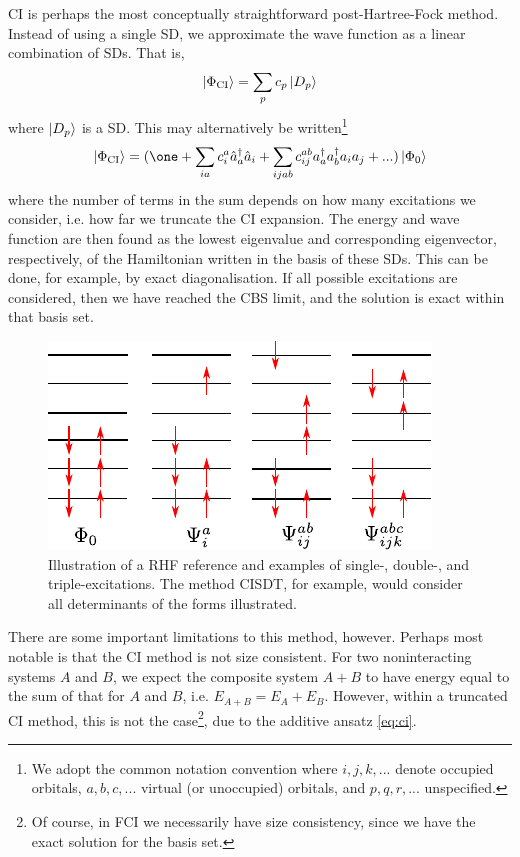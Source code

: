 \Gls{CI} is perhaps the most conceptually straightforward post-Hartree-Fock method. Instead of using a single \gls{SD}, we approximate the wave function as a linear combination of \glspl{SD}. That is,
\begin{equation}
\ket{\Phi_\mathrm{CI}} = \sum_p c_p\ket{D_p}
\end{equation}
where $\ket{D_p}$ is a \gls{SD}. This may alternatively be written\footnote{We adopt the common notation convention where $i,j,k,...$ denote occupied orbitals, $a,b,c,...$ virtual (or unoccupied) orbitals, and $p,q,r, ...$ unspecified.}
\begin{equation}
\label{eq:ci}
\ket{\Phi_\mathrm{CI}} = (\one + \sum_{ia}c_i^a\hat a_a^\dag\hat a_i +
\sum_{ijab}c_{ij}^{ab} a_a^\dag a_b^\dag a_i a_j+...)\ket{\Phi_0}
\end{equation}
where the number of terms in the sum depends on how many excitations we consider, i.e. how far we truncate the \gls{CI} expansion. The energy and wave function are then found as the lowest eigenvalue and corresponding eigenvector, respectively, of the Hamiltonian written in the basis of these \glspl{SD}. This can be done, for example, by exact diagonalisation. If all possible excitations are considered, then we have reached the \gls{CBS} limit, and the solution is exact within that basis set.

\begin{figure}[htbp]
    \centering
    \includegraphics{figures/intro/configurations.pdf}
    \caption{Illustration of a \gls{RHF} reference and examples of single-, double-, and triple-excitations. The method CISDT, for example, would consider all determinants of the forms illustrated.}
    \label{fig:excitations}
\end{figure}

There are some important limitations to this method, however. Perhaps most notable is that the \gls{CI} method is not size consistent. For two noninteracting systems $A$ and $B$, we expect the composite system $A+B$ to have energy equal to the sum of that for $A$ and $B$, i.e. $E_{A+B}=E_A+E_B$. However, within a truncated \gls{CI} method, this is not the case\footnote{Of course, in \gls{FCI} we necessarily have size consistency, since we have the exact solution for the basis set.}, due to the additive ansatz \eqref{eq:ci}.

